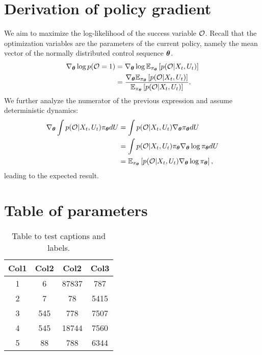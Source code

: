 \section{Derivation of policy gradient}\label{sec:app_derivation_policy_gradient}
We aim to maximize the log-likelihood of the success variable $\mathcal{O}$. Recall that the optimization variables are the parameters of the current policy, namely the mean vector of the normally distributed control sequence $\boldsymbol{\theta}$. 
\begin{align*}
    \nabla_{\boldsymbol{\theta}} \log p(\mathcal{O} = 1) &= \nabla_{\boldsymbol{\theta}} \log \mathbb{E}_{\pi_{\boldsymbol{\theta}}} \left [p(\mathcal{O} | X_t, U_t)\right] \\
    &= \frac{\nabla_{\boldsymbol{\theta}} \mathbb{E}_{\pi_{\boldsymbol{\theta}}} \left [p(\mathcal{O} | X_t, U_t)\right]}{\mathbb{E}_{\pi_{\boldsymbol{\theta}}} \left [p(\mathcal{O} | X_t, U_t)\right]}.
\end{align*}
We further analyze the numerator of the previous expression and assume deterministic dynamics:
\begin{align*}
    \nabla_{\boldsymbol{\theta}} \int p(\mathcal{O} | X_t, U_t) \pi_{\boldsymbol{\theta}} dU &= \int p(\mathcal{O} | X_t, U_t) \nabla_{\boldsymbol{\theta}} \pi_{\boldsymbol{\theta}} dU \\
    &= \int p(\mathcal{O} | X_t, U_t) \pi_{\boldsymbol{\theta}} \nabla_{\boldsymbol{\theta}} \log \pi_{\boldsymbol{\theta}} dU \\
    &= \mathbb{E}_{\pi_{\boldsymbol{\theta}}} \left [p(\mathcal{O} | X_t, U_t) \nabla_{\boldsymbol{\theta}} \log \pi_{\boldsymbol{\theta}}\right],
\end{align*}
leading to the expected result. 


\section{Table of parameters}\label{app:table_of_parameters}

\begin{table}[h!]
\centering
\begin{tabular}{||c c c c||} \label{ta}
 \hline
 Col1 & Col2 & Col2 & Col3 \\ [0.5ex] 
 \hline\hline
 1 & 6 & 87837 & 787 \\ 
 \hline
 2 & 7 & 78 & 5415 \\
 \hline
 3 & 545 & 778 & 7507 \\
 \hline
 4 & 545 & 18744 & 7560 \\
 \hline
 5 & 88 & 788 & 6344 \\ [1ex] 
 \hline
\end{tabular}
\caption{Table to test captions and labels.}
\label{tab:parameters}
\end{table}